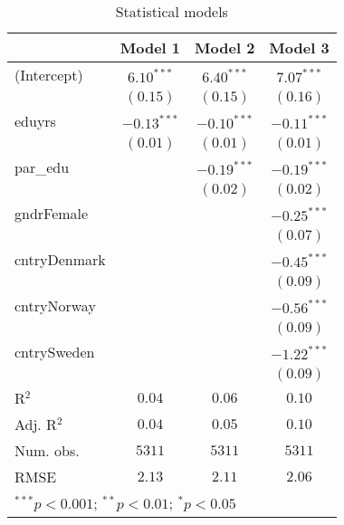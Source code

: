 
\begin{table}
\begin{center}
\begin{tabular}{l c c c}
\hline
 & Model 1 & Model 2 & Model 3 \\
\hline
(Intercept)  & $6.10^{***}$  & $6.40^{***}$  & $7.07^{***}$  \\
             & $(0.15)$      & $(0.15)$      & $(0.16)$      \\
eduyrs       & $-0.13^{***}$ & $-0.10^{***}$ & $-0.11^{***}$ \\
             & $(0.01)$      & $(0.01)$      & $(0.01)$      \\
par\_edu     &               & $-0.19^{***}$ & $-0.19^{***}$ \\
             &               & $(0.02)$      & $(0.02)$      \\
gndrFemale   &               &               & $-0.25^{***}$ \\
             &               &               & $(0.07)$      \\
cntryDenmark &               &               & $-0.45^{***}$ \\
             &               &               & $(0.09)$      \\
cntryNorway  &               &               & $-0.56^{***}$ \\
             &               &               & $(0.09)$      \\
cntrySweden  &               &               & $-1.22^{***}$ \\
             &               &               & $(0.09)$      \\
\hline
R$^2$        & $0.04$        & $0.06$        & $0.10$        \\
Adj. R$^2$   & $0.04$        & $0.05$        & $0.10$        \\
Num. obs.    & $5311$        & $5311$        & $5311$        \\
RMSE         & $2.13$        & $2.11$        & $2.06$        \\
\hline
\multicolumn{4}{l}{\scriptsize{$^{***}p<0.001$; $^{**}p<0.01$; $^{*}p<0.05$}}
\end{tabular}
\caption{Statistical models}
\label{table:coefficients}
\end{center}
\end{table}
